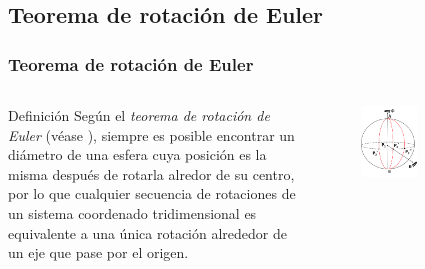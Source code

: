 \documentclass{beamer}
\begin{document}
\subsection{Teorema de rotación de Euler}
\begin{frame}
  \frametitle{Teorema de rotación de Euler}
  \begin{columns}
    \begin{block}{Definición}
      Según el \emph{teorema de rotación de Euler} (véase \cite{euler_rotations}), siempre es posible encontrar un diámetro de una esfera cuya posición es la misma después de rotarla alredor de su centro, por lo que cualquier secuencia de rotaciones de un sistema coordenado tridimensional es equivalente a una única rotación alrededor de un eje que pase por el origen.\\
    \end{block}

    \begin{figure}
      \includegraphics[width=0.5\textwidth]{euler_rotation.png}
    \end{figure}
  \end{columns}      
\end{frame}
\end{document}

